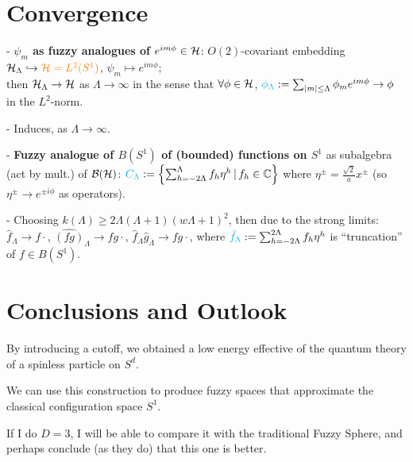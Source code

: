 \linea


\section{Convergence}

{
    \color{gray}
    
    - \textbf{$\psi_m$ as fuzzy analogues of $e^{i m \phi} \in \hcal$}: $O(2)$-covariant embedding $\mathcal H_\Lambda \hookrightarrow \textcolor{orange}{\mathcal H = L^2(S^1)}$, $\psi_m \mapsto e^{im\phi}$; \hfill \\then $\mathcal H_\Lambda \to \mathcal H$ as $\Lambda \to \infty$ in the sense that $\forall \phi \in \hcal$, $\lbtext{\phi_\Lambda} := \sum_{|m| \leq \Lambda} \phi_m e^{im\phi} \to \phi$ in the $L^2$-norm.
    
    - Induces,  as $\Lambda \to \infty$.
    
    - \textbf{Fuzzy analogue of $B(S^1)$ of (bounded) functions on $S^1$} as subalgebra (act by mult.) of $\mathcal B(\mathcal H)$: $\textcolor{cyan}{C_\Lambda} := \left\{ \sum_{h = -2\Lambda}^\Lambda f_h \eta^h \,|\, f_h \in \mathbb{C}\right\}$ where $\eta^\pm  = \frac{\sqrt{2}}{a}x^\pm$ (so $\eta^\pm \to e^{\pm i \phi}$ as operators).
    
    - Choosing $k(\Lambda) \geq 2 \Lambda(\Lambda + 1)(w\Lambda+1)^2$, then  due to the strong limits: $\hat f_\Lambda \to f\cdot$, $\hat{(fg)}_\Lambda \to fg\cdot $, $\hat f_\Lambda \hat g_\Lambda \to fg\cdot$, where $\textcolor{cyan}{\hat f_\Lambda} := \sum_{h = -2\Lambda}^{2\Lambda} f_h \eta^h$ is ``truncation'' of $f \in B(S^1)$.
    
}

\linea

\section{Conclusions and Outlook}

{\color{gray}

    By introducing a cutoff, we obtained a low energy effective of the quantum theory of a spinless particle on $S^d$.
    
    We can use this construction to produce fuzzy spaces that approximate the classical configuration space $S^1$.
    
    If I do $D = 3$, I will be able to compare it with the traditional Fuzzy Sphere, and perhaps conclude (as they do) that this one is better.
}